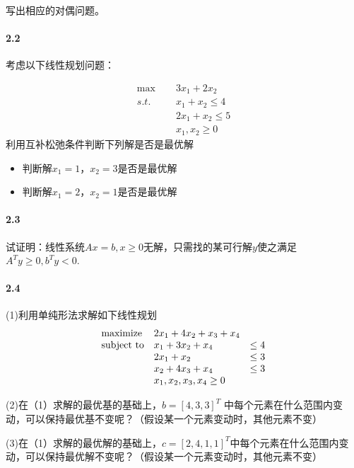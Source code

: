 \documentclass[12pt,a4paper]{article}
\begin{document}
写出相应的对偶问题。

\paragraph{2.2}
考虑以下线性规划问题：

\begin{align*}
   \max \quad &\; 3x_1 + 2x_2\\
   s.t.\quad &\;x_1 + x_2 \leq 4 \\
&\;2x_1 + x_2 \leq 5 \\
&\;x_1, x_2 \geq 0
\end{align*}
利用互补松弛条件判断下列解是否是最优解
\begin{itemize}
    \item 判断解\( x_1 = 1 \)，\( x_2 = 3 \)是否是最优解
    \item 判断解\( x_1 = 2 \)，\( x_2 = 1 \)是否是最优解
\end{itemize}

\paragraph{2.3}
试证明：线性系统$Ax=b, x \geq 0$无解，只需找的某可行解$y$使之满足$A^Ty\geq0, b^Ty<0$.


\paragraph{2.4}
(1)利用单纯形法求解如下线性规划
\begin{equation*}
\begin{array}{lllll@{}ll}
\text{maximize}  & 2x_1+4x_2+x_3+x_4 &\\
\text{subject to}& x_1+3x_2 +x_4    &\leq 4 \\
&2x_1 +x_2   &\leq 3  \\
&x_2 +4x_3+x_4   &\leq 3  \\
&x_1,x_2,x_3,x_4 \geq 0 &  
\end{array}
\end{equation*}

(2)在（1）求解的最优基的基础上，$b=[4, 3, 3]^T$ 中每个元素在什么范围内变动，可以保持最优基不变呢？（假设某一个元素变动时，其他元素不变）

(3)在（1）求解的最优解的基础上，$c=[2,4,1,1]^T$中每个元素在什么范围内变动，可以保持最优解不变呢？（假设某一个元素变动时，其他元素不变）
\end{document}
